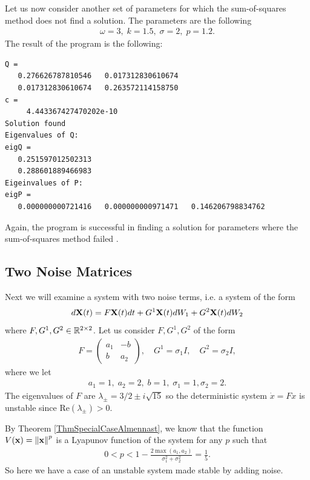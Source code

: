 \documentclass[a4paper,12pt,twoside,BCOR=10mm]{scrbook}
\begin{document}
Let us now consider another set of parameters for which the sum-of-squares method does not find a solution. The parameters are the following
\begin{align*}
    \omega = 3, \; k = 1.5, \; \sigma = 2, \; p = 1.2.
\end{align*}
The result of the program is the following:
\begin{lstlisting}
Q =
   0.276626787810546   0.017312830610674
   0.017312830610674   0.263572114158750
c =
     4.443367427470202e-10
Solution found
Eigenvalues of Q:
eigQ =
   0.251597012502313
   0.288601889466983
Eigeinvalues of P:
eigP =
   0.000000000721416   0.000000000971471   0.146206798834762
\end{lstlisting}
Again, the program is successful in finding a solution for parameters where the sum-of-squares method failed \citep{HGGS2018localLya}.

\subsection{Two Noise Matrices}
Next we will examine a system with two noise terms, i.e. a system of the form
\begin{align*}
    d\mathbf{X}(t) = F\mathbf{X}(t)dt + G^1\mathbf{X}(t)dW_1 + G^2\mathbf{X}(t)dW_2
\end{align*}
where $F,G^1,G^2\in \mathbb{R}^{2\times 2}$. Let us consider $F, G^1, G^2$ of the form
\begin{align*}
    F = \begin{pmatrix}
    a_1 & -b\\
    b & a_2
    \end{pmatrix}
    , \quad
    G^1 = \sigma_1 I
    , \quad
    G^2 = \sigma_2 I,
\end{align*}
where we let
\begin{align*}
    a_1 = 1,\; a_2 = 2,\; b = 1, \; \sigma_1 = 1, \sigma_2 = 2.
\end{align*}
The eigenvalues of $F$ are $\lambda_{\pm} = 3/2 \pm i\sqrt{15}$ so the deterministic system $\Dot{x} = Fx$ is unstable since $\text{Re}(\lambda_\pm) > 0$.

By Theorem \ref{ThmSpecialCaseAlmennast}, we know that the function $V(\mathbf{x}) = \left\lVert\mathbf{x}\right\rVert_{}^{p}$ is a Lyapunov function of the system for any $p$ such that
\begin{align*}
    0 < p < 1 - \frac{2\max{(a_1, a_2)}}{\sigma_1^2 + \sigma_2^2} = \frac{1}{5}.
\end{align*}
So here we have a case of an unstable system made stable by adding noise.
\end{document}
